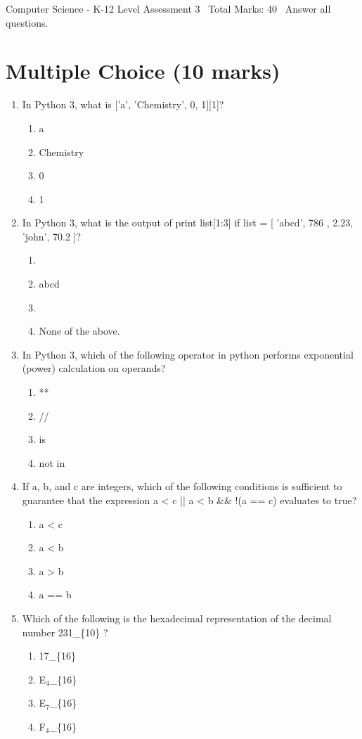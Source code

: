 \documentclass[12pt]{article}
\begin{document}
\begin{center}
Computer Science - K-12 Level Assessment 3 \
Total Marks: 40 \
Answer all questions.
\end{center}

\section*{Multiple Choice (10 marks)}
\begin{enumerate}[label=\arabic*.]
\item In Python 3, what is ['a', 'Chemistry', 0, 1][1]?
\begin{enumerate}[label=(\alph*)]
    \item a
    \item Chemistry
    \item 0
    \item 1
\end{enumerate}
\item In Python 3, what is the output of print list[1:3] if list = [ 'abcd', 786 , 2.23, 'john', 70.2 ]?
\begin{enumerate}[label=(\alph*)]
    \item [ 'abcd', 786 , 2.23, 'john', 70.2 ]
    \item abcd
    \item [786, 2.23]
    \item None of the above.
\end{enumerate}
\item In Python 3, which of the following operator in python performs exponential (power) calculation on operands?
\begin{enumerate}[label=(\alph*)]
    \item **
    \item //
    \item is
    \item not in
\end{enumerate}
\item If a, b, and c are integers, which of the following conditions is sufficient to guarantee that the expression a \textless{} c || a \textless{} b \&\& !(a == c) evaluates to true?
\begin{enumerate}[label=(\alph*)]
    \item a \textless{} c
    \item a \textless{} b
    \item a \textgreater{} b
    \item a == b
\end{enumerate}
\item Which of the following is the hexadecimal representation of the decimal number 231\_\{10\} ?
\begin{enumerate}[label=(\alph*)]
    \item 17\_\{16\}
    \item E$_{4}$\_\{16\}
    \item E$_{7}$\_\{16\}
    \item F$_{4}$\_\{16\}
\end{enumerate}
\end{enumerate}
\end{document}
